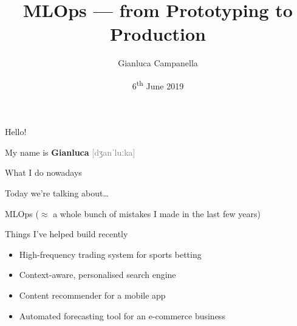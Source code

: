 \documentclass[12pt,aspectratio=169]{beamer}
\title{MLOps --- from Prototyping to Production}
\author{Gianluca Campanella}
\date{6\textsuperscript{th} June 2019}
\begin{document}
\maketitle

\begin{frame}{Hello!}
    \begin{center}
        \LARGE%
        My name is \textbf{Gianluca}
        {\textcolor{gray}{[dʒanˈluːka]}}
    \end{center}
\end{frame}

\begin{frame}{What I do nowadays}
    \LARGE%
\end{frame}

\begin{frame}{Today we're talking about\ldots}
    \begin{center}
        {\Huge%
         MLOps}
        \vfill\pause
        ($\approx$ a whole bunch of mistakes I made in the last few years)
    \end{center}
\end{frame}

\begin{frame}{Things I've helped build recently}
    \begin{itemize}
        \setlength{\itemsep}{\bigskipamount}%
        \item High\hyp{}frequency trading system for sports betting
        \item Context\hyp{}aware, personalised search engine
        \item Content recommender for a mobile app
        \item Automated forecasting tool for an e\hyp{}commerce business
    \end{itemize}
\end{frame}
\end{document}
